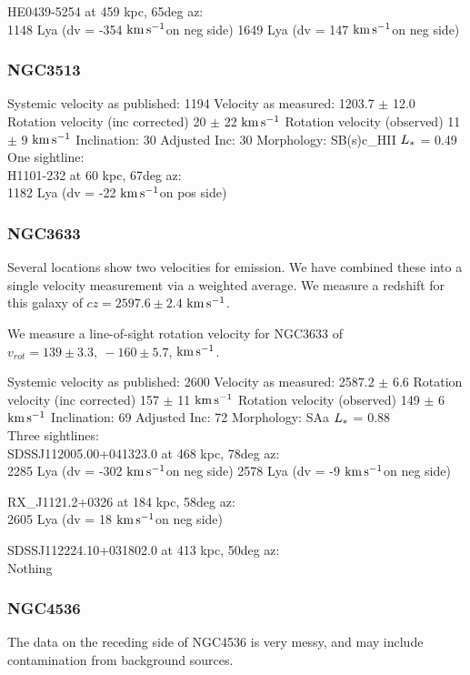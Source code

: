 \documentclass[iop]{emulateapj-rtx4}
\newcommand{\kms}{$\rm km\, s^{-1}$}
\begin{document}
HE0439-5254 at 459 kpc, 65deg az: \\
1148 Lya (dv = -354 \kms on neg side)
1649 Lya (dv = 147 \kms on neg side)



\subsubsection{NGC3513}
Systemic velocity as published: 1194
Velocity as measured: 1203.7 $\pm$ 12.0
Rotation velocity (inc corrected) 20 $\pm$ 22 \kms
Rotation velocity (observed) 11 $\pm$ 9 \kms
Inclination: 30
Adjusted Inc: 30
Morphology: SB(s)c\_HII
$L_{\**}$ = 0.49 \\

One sightline: \\
H1101-232 at 60 kpc, 67deg az: \\
1182 Lya (dv = -22 \kms on pos side)


\subsubsection{NGC3633}
Several locations show two velocities for emission. We have combined these into a single velocity measurement via a weighted average. We measure a redshift for this galaxy of $cz = 2597.6 \pm 2.4$ \kms.

We measure a line-of-sight rotation velocity for NGC3633 of $v_{rot}=139\pm 3.3,~-160\pm5.7$,  \kms.


Systemic velocity as published: 2600
Velocity as measured: 2587.2 $\pm$ 6.6
Rotation velocity (inc corrected) 157 $\pm$ 11 \kms
Rotation velocity (observed) 149 $\pm$ 6 \kms
Inclination: 69
Adjusted Inc: 72
Morphology: SAa
$L_{\**}$ = 0.88 \\

Three sightlines: \\
SDSSJ112005.00+041323.0 at 468 kpc, 78deg az: \\
2285 Lya (dv = -302 \kms on neg side)
2578 Lya (dv = -9 \kms on neg side)


RX\_J1121.2+0326 at 184 kpc, 58deg az: \\
2605 Lya (dv = 18 \kms on neg side)


SDSSJ112224.10+031802.0 at 413 kpc, 50deg az: \\
Nothing


\subsubsection{NGC4536}
The data on the receding side of NGC4536 is very messy, and may include contamination from background sources. 
\end{document}
